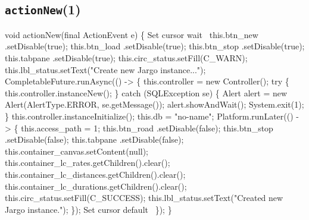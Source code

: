 \subsection{\texttt{actionNew}(1)}
\nwenddocs{}\endmoddef{}
void actionNew(final ActionEvent e) \{
  \LA{}Set cursor wait~{\nwtagstyle{}}\RA{}
  this.btn_new      .setDisable(true);
  this.btn_load     .setDisable(true);
  this.btn_stop     .setDisable(true);
  this.tabpane      .setDisable(true);
  this.circ_status.setFill(C_WARN);
  this.lbl_status.setText("Create new Jargo instance...");
  CompletableFuture.runAsync(() -> \{
    this.controller = new Controller();
    try \{
      this.controller.instanceNew();
    \} catch (SQLException se) \{
      Alert alert = new Alert(AlertType.ERROR, se.getMessage());
      alert.showAndWait();
      System.exit(1);
    \}
    this.controller.instanceInitialize();
    this.db = "no-name";
    Platform.runLater(() -> \{
      this.access_path = 1;
      this.btn_road     .setDisable(false);
      this.btn_stop     .setDisable(false);
      this.tabpane      .setDisable(false);
      this.container_canvas.setContent(null);
      this.container_lc_rates.getChildren().clear();
      this.container_lc_distances.getChildren().clear();
      this.container_lc_durations.getChildren().clear();
      this.circ_status.setFill(C_SUCCESS);
      this.lbl_status.setText("Created new Jargo instance.");
    \});
    \LA{}Set cursor default~{\nwtagstyle{}}\RA{}
  \});
\}
\eatline
{}\nwendcode{}\nwdocspar
